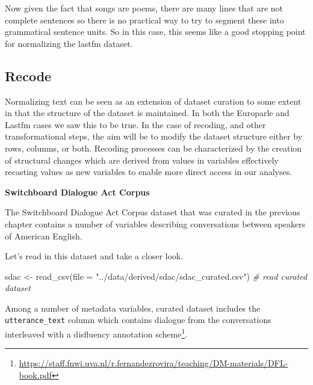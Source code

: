 \documentclass[
]{article}
\newenvironment{Shaded}{\begin{snugshade}}{\end{snugshade}}
\newcommand{\AttributeTok}[1]{\textcolor[rgb]{0.77,0.63,0.00}{#1}}
\newcommand{\CommentTok}[1]{\textcolor[rgb]{0.56,0.35,0.01}{\textit{#1}}}
\newcommand{\FunctionTok}[1]{\textcolor[rgb]{0.00,0.00,0.00}{#1}}
\newcommand{\NormalTok}[1]{#1}
\newcommand{\OtherTok}[1]{\textcolor[rgb]{0.56,0.35,0.01}{#1}}
\newcommand{\StringTok}[1]{\textcolor[rgb]{0.31,0.60,0.02}{#1}}
\DeclareRobustCommand{\href}[2]{#2\footnote{\url{#1}}}
\begin{document}
Now given the fact that songs are poems, there are many lines that are not complete sentences so there is no practical way to try to segment these into grammatical sentence units. So in this case, this seems like a good stopping point for normalizing the lastfm dataset.

\hypertarget{recode}{%
\subsection{Recode}\label{recode}}

Normalizing text can be seen as an extension of dataset curation to some extent in that the structure of the dataset is maintained. In both the Europarle and Lastfm cases we saw this to be true. In the case of recoding, and other transformational steps, the aim will be to modify the dataset structure either by rows, columns, or both. Recoding processes can be characterized by the creation of structural changes which are derived from values in variables effectively recasting values as new variables to enable more direct access in our analyses.

\textbf{Switchboard Dialogue Act Corpus}

The Switchboard Dialogue Act Corpus dataset that was curated in the previous chapter contains a number of variables describing conversations between speakers of American English.

Let's read in this dataset and take a closer look.

\begin{Shaded}
\begin{Highlighting}[]
\NormalTok{sdac }\OtherTok{\textless{}{-}} \FunctionTok{read\_csv}\NormalTok{(}\AttributeTok{file =} \StringTok{"../data/derived/sdac/sdac\_curated.csv"}\NormalTok{)  }\CommentTok{\# read curated dataset}
\end{Highlighting}
\end{Shaded}

Among a number of metadata variables, curated dataset includes the \texttt{utterance\_text} column which contains dialogue from the conversations interleaved with a \href{https://staff.fnwi.uva.nl/r.fernandezrovira/teaching/DM-materials/DFL-book.pdf}{disfluency annotation scheme}.
\end{document}
